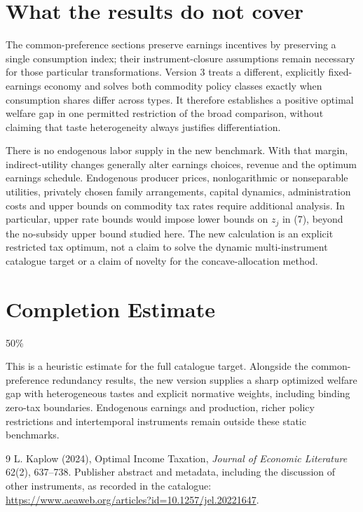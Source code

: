 \documentclass[11pt]{article}
\theoremstyle{definition}
\begin{document}
\section*{What the results do not cover}
The common-preference sections preserve earnings incentives by preserving
a single consumption index; their instrument-closure assumptions remain
necessary for those particular transformations. Version 3 treats a
different, explicitly fixed-earnings economy and solves both commodity
policy classes exactly when consumption shares differ across types.
It therefore establishes a positive optimal welfare gap in one permitted
restriction of the broad comparison, without claiming that taste
heterogeneity always justifies differentiation.

There is no endogenous labor supply in the new benchmark. With that
margin, indirect-utility changes generally alter earnings choices,
revenue and the optimum earnings schedule. Endogenous producer prices,
nonlogarithmic or nonseparable utilities, privately chosen family
arrangements, capital dynamics, administration costs and upper bounds
on commodity tax rates require additional analysis. In particular,
upper rate bounds would impose lower bounds on $z_j$ in (7), beyond
the no-subsidy upper bound studied here. The new calculation is an
explicit restricted tax optimum, not a claim to solve the dynamic
multi-instrument catalogue target or a claim of novelty for the
concave-allocation method.

\section{Completion Estimate}
50\%

This is a heuristic estimate for the full catalogue target.
Alongside the common-preference redundancy results, the new version
supplies a sharp optimized welfare gap with heterogeneous tastes and
explicit normative weights, including binding zero-tax boundaries.
Endogenous earnings and production, richer policy restrictions and
intertemporal instruments remain outside these static benchmarks.

\begin{thebibliography}{9}
 L. Kaplow (2024), Optimal Income Taxation, \emph{Journal of Economic Literature} 62(2), 637--738. Publisher abstract and metadata, including the discussion of other instruments, as recorded in the catalogue: \url{https://www.aeaweb.org/articles?id=10.1257/jel.20221647}.
\end{thebibliography}
\end{document}
